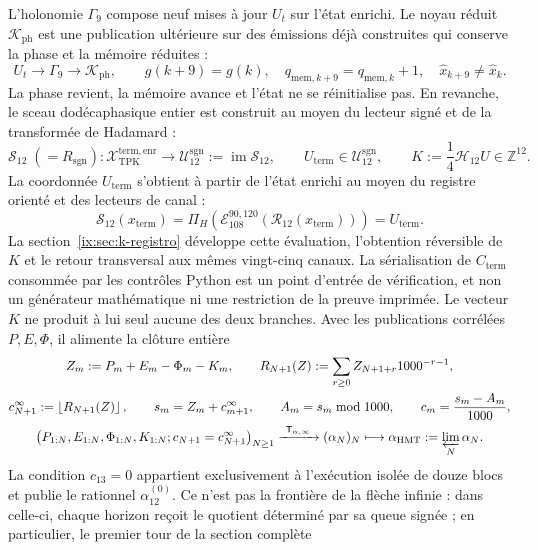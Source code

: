 L’holonomie \(\Gamma_9\) compose neuf mises à jour \(U_t\) sur l’état
enrichi. Le noyau réduit \(\mathcal K_{\mathrm{ph}}\) est une publication
ultérieure sur des émissions déjà construites qui conserve la phase et la mémoire réduites :
\[
 U_t\longrightarrow\Gamma_9\longrightarrow\mathcal K_{\mathrm{ph}},
 \qquad
 g(k+9)=g(k),\quad
 q_{\mathrm{mem},k+9}=q_{\mathrm{mem},k}+1,\quad
 \widehat x_{k+9}\neq\widehat x_k.
\]
La phase revient, la mémoire avance et l’état ne se réinitialise pas. En revanche, le
sceau dodécaphasique entier est construit au moyen du lecteur signé et de la
transformée de Hadamard :
\[
 \mathcal S_{12}\;(=R_{\mathrm{sgn}}):
 \mathcal X_{\mathrm{TPK}}^{\mathrm{term,enr}}
 \longrightarrow
 \mathcal U_{12}^{\mathrm{sgn}}:=\operatorname{im}\mathcal S_{12},
 \qquad
 U_{\mathrm{term}}\in\mathcal U_{12}^{\mathrm{sgn}},
 \qquad
 K:=\frac14\mathcal H_{12}U\in\mathbb Z^{12}.
\]
La coordonnée \(U_{\mathrm{term}}\) s’obtient à partir de l’état enrichi au moyen
du registre orienté et des lecteurs de canal :
\[
 \mathcal S_{12}(x_{\mathrm{term}})
 =\Pi_H\!\left(
   \mathcal E_{108}^{90,120}
   (\mathcal R_{12}(x_{\mathrm{term}}))\right)
 =U_{\mathrm{term}}.
\]
La section~\ref{ix:sec:k-registro} développe cette évaluation, l'obtention réversible de \(K\) et le retour transversal aux mêmes vingt-cinq canaux. La sérialisation de \(C_{\mathrm{term}}\) consommée par les contrôles Python est un point d'entrée de vérification, et non un générateur mathématique ni une restriction de la preuve imprimée.
Le vecteur \(K\) ne produit à lui seul aucune des deux branches. Avec les publications corrélées \(P,E,\Phi\), il alimente la clôture entière
\[
 \begin{gathered}
 Z_m:=P_m+E_m-\Phi_m-K_m,\qquad
 R_{N+1}(Z):=\sum_{r\geq0}Z_{N+1+r}1000^{-r-1},\\
 c_{N+1}^{\infty}:=\left\lfloor R_{N+1}(Z)\right\rfloor,\qquad
 s_m=Z_m+c_{m+1}^{\infty},\qquad
 A_m=s_m\bmod1000,\qquad
 c_m=\frac{s_m-A_m}{1000},\\
 \bigl(P_{1:N},E_{1:N},\Phi_{1:N},K_{1:N};
       c_{N+1}=c_{N+1}^{\infty}\bigr)_{N\geq1}
 \xrightarrow{\ \mathsf T_{\alpha,\infty}\ }
 (\alpha_N)_N
 \longmapsto
 \alpha_{\mathrm{HMT}}:=\varprojlim_N\alpha_N.
 \end{gathered}
\]
La condition \(c_{13}=0\) appartient exclusivement à l’exécution isolée de
douze blocs et publie le rationnel \(\alpha_{12}^{(0)}\). Ce n’est pas la frontière
de la flèche infinie : dans celle-ci, chaque horizon reçoit le quotient déterminé
par sa queue signée ; en particulier, le premier tour de la section complète
